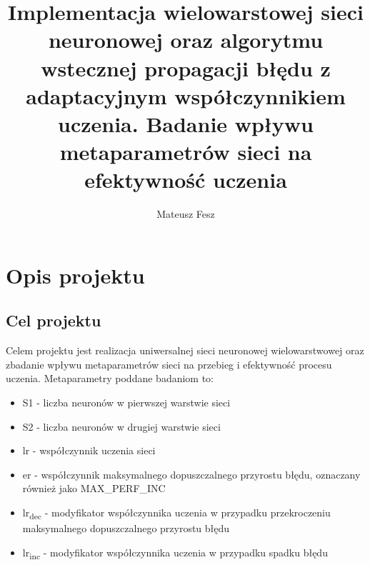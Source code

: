 \documentclass[12pt,twoside]{article}
\author{Mateusz Fesz}
\title{Implementacja wielowarstowej sieci neuronowej oraz algorytmu wstecznej propagacji błędu z adaptacyjnym współczynnikiem uczenia. Badanie wpływu metaparametrów sieci na efektywność uczenia}
\begin{document}
\maketitle

\blankpage

\tableofcontents

\clearpage

\section{Opis projektu}
\subsection{Cel projektu}
Celem projektu jest realizacja uniwersalnej sieci neuronowej wielowarstwowej oraz zbadanie wpływu metaparametrów sieci na przebieg i efektywność procesu uczenia.
Metaparametry poddane badaniom to:
\begin{itemize}
	\item S1 - liczba neuronów w pierwszej warstwie sieci
	\item S2 - liczba neuronów w drugiej warstwie sieci
	\item lr - współczynnik uczenia sieci
	\item er - współczynnik maksymalnego dopuszczalnego przyrostu błędu, oznaczany również jako MAX\_PERF\_INC
	\item lr\textsubscript{dec} - modyfikator współczynnika uczenia w przypadku przekroczeniu maksymalnego dopuszczalnego przyrostu błędu
	\item lr\textsubscript{inc} - modyfikator współczynnika uczenia w przypadku spadku błędu
\end{itemize}
\end{document}
